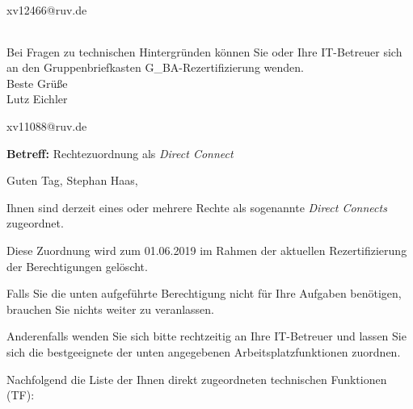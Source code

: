 \documentclass[a4paper,landscape,12pt]{letter}
\begin{document}
\begin{letter}{xv12466@ruv.de\hfill \break}
\begin{tiny}
\begin{longtable}{|p{35mm}|p{15mm}|p{25mm}|p{10mm}|p{40mm}|p{50mm}|p{50mm}|}
\hline
		\end{longtable}
		\end{tiny}
	
\begin{minipage}{\textwidth}
			Bei Fragen zu technischen Hintergründen können Sie 
			oder Ihre IT-Betreuer sich an den Gruppenbriefkasten 
			G\_BA-Rezertifizierung
			wenden.\\
			\linebreak
			Beste Grüße\\
			Lutz Eichler
	\end{minipage}
	\end{letter}
	
\begin{letter}{xv11088@ruv.de\hfill \break}
\begin{normalsize}
	\opening{\textbf{Betreff:} Rechtezuordnung als \emph{Direct Connect}}
	\begin{normalsize} \hfill
	\end{normalsize}

	\begin{normalsize}
		Guten Tag, 
	Stephan Haas, \hfill \break
	\end{normalsize}
	\end{normalsize}
	
\begin{normalsize}
	Ihnen sind derzeit eines oder mehrere Rechte als sogenannte \emph{Direct Connects} zugeordnet.
	
	Diese Zuordnung wird zum 01.06.2019 im Rahmen der aktuellen Rezertifizierung der Berechtigungen gelöscht.
	
	Falls Sie die unten aufgeführte Berechtigung nicht für Ihre Aufgaben benötigen, 
	brauchen Sie nichts weiter zu veranlassen.
	
	Anderenfalls wenden Sie sich bitte rechtzeitig an Ihre IT-Betreuer 
	und lassen Sie sich die bestgeeignete der unten angegebenen Arbeitsplatzfunktionen zuordnen.
	\end{normalsize}
	
\begin{normalsize}
	Nachfolgend die Liste der Ihnen direkt zugeordneten technischen Funktionen (TF):


\end{normalsize}
\end{letter}
\end{document}
